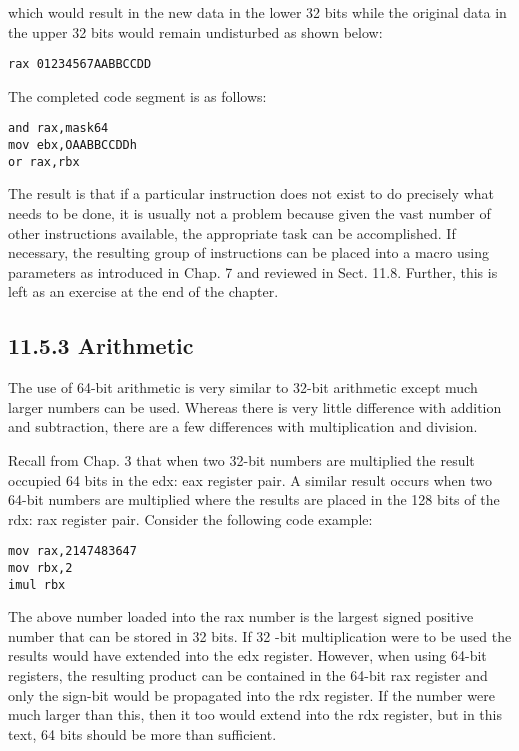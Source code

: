 \documentclass[10pt]{article}
\begin{document}
which would result in the new data in the lower 32 bits while the original data in the upper 32 bits would remain undisturbed as shown below:

\begin{verbatim}
rax 01234567AABBCCDD
\end{verbatim}

The completed code segment is as follows:

\begin{verbatim}
and rax,mask64
mov ebx,OAABBCCDDh
or rax,rbx
\end{verbatim}

The result is that if a particular instruction does not exist to do precisely what needs to be done, it is usually not a problem because given the vast number of other instructions available, the appropriate task can be accomplished. If necessary, the resulting group of instructions can be placed into a macro using parameters as introduced in Chap. 7 and reviewed in Sect. 11.8. Further, this is left as an exercise at the end of the chapter.

\subsection*{11.5.3 Arithmetic}
The use of 64-bit arithmetic is very similar to 32-bit arithmetic except much larger numbers can be used. Whereas there is very little difference with addition and subtraction, there are a few differences with multiplication and division.

Recall from Chap. 3 that when two 32-bit numbers are multiplied the result occupied 64 bits in the edx: eax register pair. A similar result occurs when two 64-bit numbers are multiplied where the results are placed in the 128 bits of the rdx: rax register pair. Consider the following code example:

\begin{verbatim}
mov rax,2147483647
mov rbx,2
imul rbx
\end{verbatim}

The above number loaded into the rax number is the largest signed positive number that can be stored in 32 bits. If 32 -bit multiplication were to be used the results would have extended into the edx register. However, when using 64-bit registers, the resulting product can be contained in the 64-bit rax register and only the sign-bit would be propagated into the rdx register. If the number were much larger than this, then it too would extend into the rdx register, but in this text, 64 bits should be more than sufficient.
\end{document}
